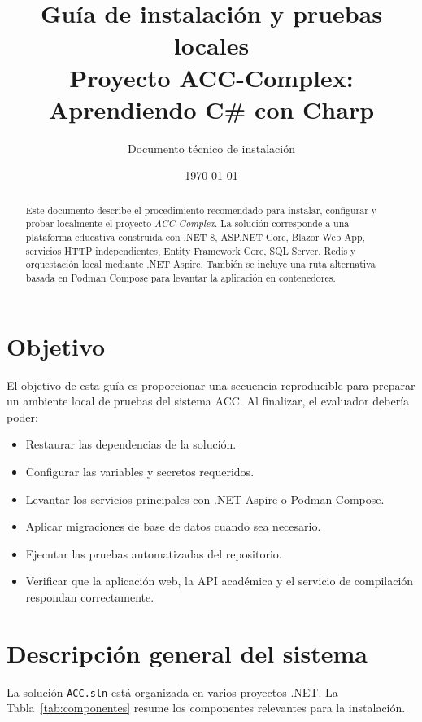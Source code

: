 \documentclass[12pt,letterpaper]{article}
\title{\textbf{Gu\'ia de instalaci\'on y pruebas locales}\\
\large Proyecto ACC-Complex: Aprendiendo C\# con Charp}
\author{Documento t\'ecnico de instalaci\'on}
\date{\today}
\begin{document}
\maketitle

\begin{abstract}
Este documento describe el procedimiento recomendado para instalar, configurar y probar localmente el proyecto \textit{ACC-Complex}. La soluci\'on corresponde a una plataforma educativa construida con .NET 8, ASP.NET Core, Blazor Web App, servicios HTTP independientes, Entity Framework Core, SQL Server, Redis y orquestaci\'on local mediante .NET Aspire. Tambi\'en se incluye una ruta alternativa basada en Podman Compose para levantar la aplicaci\'on en contenedores.
\end{abstract}

\tableofcontents
\newpage

\section{Objetivo}

El objetivo de esta gu\'ia es proporcionar una secuencia reproducible para preparar un ambiente local de pruebas del sistema ACC. Al finalizar, el evaluador deber\'ia poder:

\begin{itemize}[noitemsep]
    \item Restaurar las dependencias de la soluci\'on.
    \item Configurar las variables y secretos requeridos.
    \item Levantar los servicios principales con .NET Aspire o Podman Compose.
    \item Aplicar migraciones de base de datos cuando sea necesario.
    \item Ejecutar las pruebas automatizadas del repositorio.
    \item Verificar que la aplicaci\'on web, la API acad\'emica y el servicio de compilaci\'on respondan correctamente.
\end{itemize}

\section{Descripci\'on general del sistema}

La soluci\'on \texttt{ACC.sln} est\'a organizada en varios proyectos .NET. La Tabla~\ref{tab:componentes} resume los componentes relevantes para la instalaci\'on.
\end{document}
